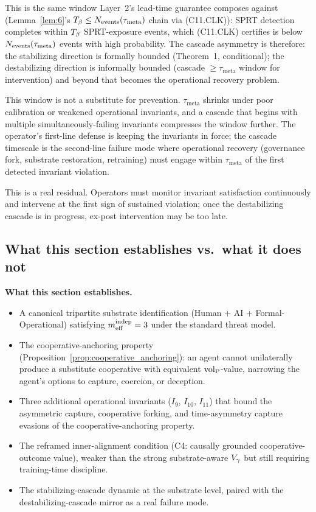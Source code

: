 This is the same window Layer~2's lead-time guarantee composes
against (Lemma~\ref{lem:6}'s $T_{\beta} \leq N_{\mathrm{events}}(\tau_{\mathrm{meta}})$
chain via (C11.CLK)): SPRT detection completes within $T_{\beta}$
SPRT-exposure events, which (C11.CLK) certifies is below
$N_{\mathrm{events}}(\tau_{\mathrm{meta}})$ events with high probability.  The
cascade asymmetry is therefore: the stabilizing direction is
formally bounded (Theorem~1, conditional); the destabilizing
direction is informally bounded (cascade $\geq \tau_{\mathrm{meta}}$
window for intervention) and beyond that becomes the operational
recovery problem.

This window is not a substitute for prevention.
$\tau_{\mathrm{meta}}$ shrinks under poor calibration or weakened
operational invariants, and a cascade that begins with multiple
simultaneously-failing invariants compresses the window further.
The operator's first-line defense is keeping the invariants in
force; the cascade timescale is the second-line failure mode where
operational recovery (governance fork, substrate restoration,
retraining) must engage within $\tau_{\mathrm{meta}}$ of the first
detected invariant violation.

This is a real residual. Operators must monitor invariant
satisfaction continuously and intervene at the first sign of
sustained violation; once the destabilizing cascade is in progress,
ex-post intervention may be too late.

\subsection{What this section establishes vs.\ what it does not}
\label{sec:section_scope}

\textbf{What this section establishes.}

\begin{itemize}
\item A canonical tripartite substrate identification (Human + AI +
  Formal-Operational) satisfying $m_{\mathrm{eff}}^{\mathrm{indep}} = 3$ under the standard
  threat model.
\item The cooperative-anchoring property
  (Proposition~\ref{prop:cooperative_anchoring}): an agent cannot
  unilaterally produce a substitute cooperative with equivalent
  ${\operatorname{vol}_{\mathrm{P}}}$-value, narrowing the agent's options to capture, coercion,
  or deception.
\item Three additional operational invariants ($I_9$, $I_{10}$,
  $I_{11}$) that bound the asymmetric capture, cooperative forking,
  and time-asymmetry capture evasions of the cooperative-anchoring
  property.
\item The reframed inner-alignment condition (C4: causally grounded
  cooperative-outcome value), weaker than the strong substrate-aware
  $V_{\gamma}$ but still requiring training-time discipline.
\item The stabilizing-cascade dynamic at the substrate level, paired
  with the destabilizing-cascade mirror as a real failure mode.
\end{itemize}

